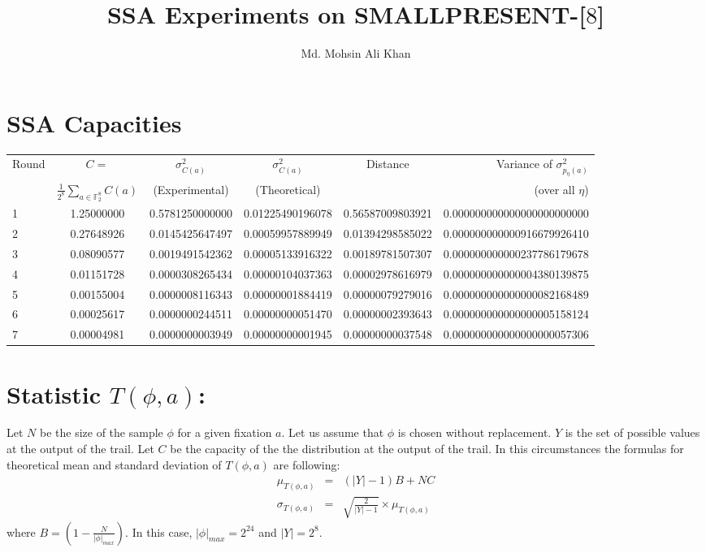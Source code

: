 \documentclass[9pt]{article}
\title{SSA Experiments on SMALLPRESENT-[$8$]}
\author{Md. Mohsin Ali Khan\\}
\begin{document}
\maketitle
\section{SSA Capacities}

\begin{center}
\begin{scriptsize}
\begin{tabular}{l*{4}{c}r} \label{table:comparing_hypothesis}
Round & $C=$ & $\sigma^2_{C(a)}$ &  $\sigma^2_{C(a)}$ & Distance & Variance of $\sigma^2_{p_{\eta}(a)}$ \\
& $\frac{1}{2^8}\sum_{a \in \mathbb{F}_2^8}C(a)$ & (Experimental) & (Theoretical) & & (over all $\eta$)\\
\hline
1 & 1.25000000 & 0.5781250000000 & 0.01225490196078 & 0.56587009803921 & 0.000000000000000000000000\\
2 & 0.27648926 & 0.0145425647497 & 0.00059957889949 & 0.01394298585022 & 0.000000000000916679926410\\
3 & 0.08090577 & 0.0019491542362 & 0.00005133916322 & 0.00189781507307 & 0.000000000000237786179678\\
4 & 0.01151728 & 0.0000308265434 & 0.00000104037363 & 0.00002978616979 & 0.000000000000004380139875\\
5 & 0.00155004 & 0.0000008116343 & 0.00000001884419 & 0.00000079279016 & 0.000000000000000082168489\\
6 & 0.00025617 & 0.0000000244511 & 0.00000000051470 & 0.00000002393643 & 0.000000000000000005158124\\
7 & 0.00004981 & 0.0000000003949 & 0.00000000001945 & 0.00000000037548 & 0.000000000000000000057306\\
\end{tabular}
\end{scriptsize}
\end{center}

\section{Statistic $T\left(\phi,a \right)$:}
Let $N$ be the size of the sample $\phi$ for a given fixation $a$. Let us assume that $\phi$ is chosen without replacement. $Y$ is the set of possible values at the output of the trail. Let $C$ be the capacity of the the distribution at the output of the trail. In this circumstances the formulas for theoretical mean and standard deviation of $T\left(\phi,a \right)$ are following:
\begin{eqnarray*}
\mu_{T\left(\phi,a\right)} &=& \left(|Y| - 1\right)B + NC \\
\sigma_{T\left(\phi,a\right)} &=& \sqrt{\frac{2}{|Y|-1}} \times \mu_{T\left(\phi,a\right)}
\end{eqnarray*} where $B = \left(1 - \frac{N}{|\phi|_{max}} \right)$.
In this case, $|\phi|_{max} = 2^{24}$ and $|Y| = 2^8$.
\end{document}
